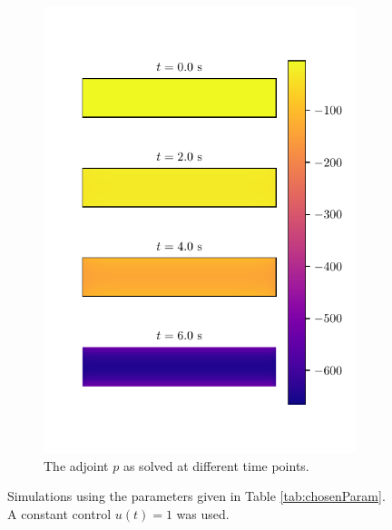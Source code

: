 \begin{figure}
{\begin{subfigure}[t]{3.5in}
    \end{subfigure}
    ~
    \begin{subfigure}[t]{3.5in}
        \includegraphics{figures/uniform_u_adjoint.pdf}
        \caption{The adjoint $p$ as solved at different time points.}
        \label{fig:state_simulations_b}
    \end{subfigure}
    }
    \caption{Simulations using the parameters given in Table \ref{tab:chosenParam}. A constant control $u(t) = 1$ was used.}
    \label{fig:state_simulations}
\end{figure}
